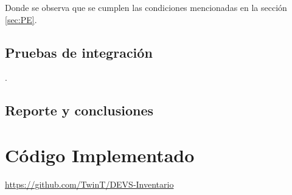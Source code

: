 \documentclass[10pt]{article}
\begin{document}
Donde se observa que se cumplen las condiciones mencionadas en la sección \ref{sec:PE}.

\subsection{Pruebas de integración}
.
\subsection{Reporte y conclusiones}


\appendix
\section{Código Implementado}

\url{https://github.com/TwinT/DEVS-Inventario}



\end{document}

